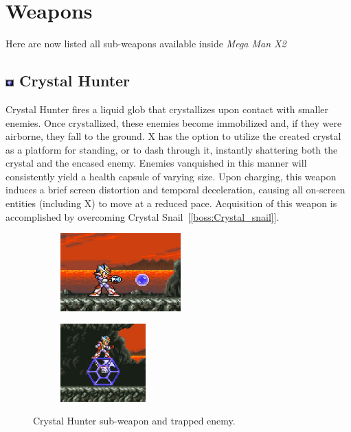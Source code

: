 \section{Weapons}\label{X2:sub_weapon}
Here are now listed all sub-weapons available inside \textit{Mega Man X2}~\cite{wiki:X_weapons}

\subsection{\includegraphics[width=12px, height=10px]{figures/X2/weapons/C_Hunter.png} Crystal Hunter}\label{Crystal_Hunter}

Crystal Hunter fires a liquid glob that crystallizes upon contact with smaller enemies. Once crystallized, these enemies become immobilized and, if they were airborne, they fall to the ground. X has the option to utilize the created crystal as a platform for standing, or to dash through it, instantly shattering both the crystal and the encased enemy. Enemies vanquished in this manner will consistently yield a health capsule of varying size. Upon charging, this weapon induces a brief screen distortion and temporal deceleration, causing all on-screen entities (including X) to move at a reduced pace. Acquisition of this weapon is accomplished by overcoming Crystal Snail~[\ref{boss:Crystal_snail}].

\begin{figure}[htp]
	\centering
	\begin{subfigure}{0.4\linewidth}
		\centering
		\includegraphics[height=3cm]{figures/X2/weapons/C_Hunter_1.png}	
	\end{subfigure}
	\begin{subfigure}{0.4\linewidth}
		\centering
		\includegraphics[height=3cm]{figures/X2/weapons/C_Hunter_2.png}	
	\end{subfigure}
	\caption{Crystal Hunter sub-weapon and trapped enemy.}
\end{figure}

